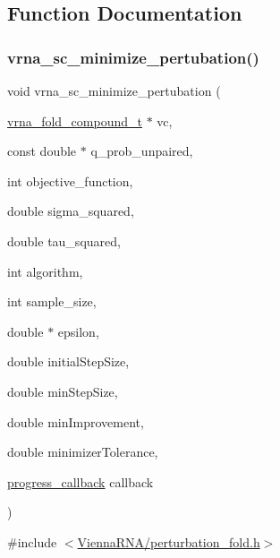 \subsection{Function Documentation}
\mbox{\label{group__perturbation_gaa124bdc20d88001c38ade590c4bcc3c4}} 
\subsubsection{\texorpdfstring{vrna\+\_\+sc\+\_\+minimize\+\_\+pertubation()}{vrna\_sc\_minimize\_pertubation()}}
{\footnotesize\ttfamily void vrna\+\_\+sc\+\_\+minimize\+\_\+pertubation (\begin{DoxyParamCaption}\item[{\hyperlink{group__fold__compound_ga1b0cef17fd40466cef5968eaeeff6166}{vrna\+\_\+fold\+\_\+compound\+\_\+t} $\ast$}]{vc,  }\item[{const double $\ast$}]{q\+\_\+prob\+\_\+unpaired,  }\item[{int}]{objective\+\_\+function,  }\item[{double}]{sigma\+\_\+squared,  }\item[{double}]{tau\+\_\+squared,  }\item[{int}]{algorithm,  }\item[{int}]{sample\+\_\+size,  }\item[{double $\ast$}]{epsilon,  }\item[{double}]{initial\+Step\+Size,  }\item[{double}]{min\+Step\+Size,  }\item[{double}]{min\+Improvement,  }\item[{double}]{minimizer\+Tolerance,  }\item[{\hyperlink{group__perturbation_gaa715397c7afd2d2955c315512a3d571a}{progress\+\_\+callback}}]{callback }\end{DoxyParamCaption})}



{\ttfamily \#include $<$\hyperlink{perturbation__fold_8h}{Vienna\+R\+N\+A/perturbation\+\_\+fold.\+h}$>$}



